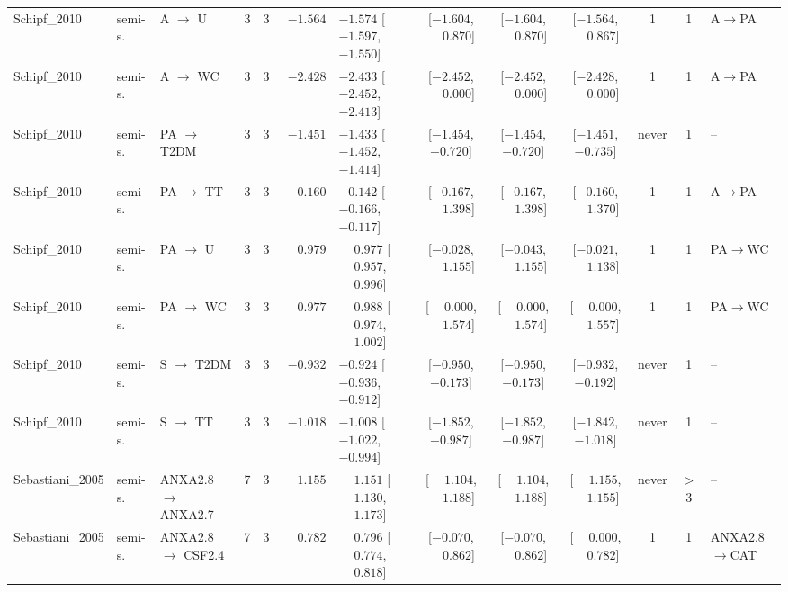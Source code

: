 \begin{landscape}
\begin{longtable}{@{}llp{2.15cm}ccrl cccc c l@{}}
Schipf\_2010 & semi-s. & A $\to$ U & 3 & 3 & $-1.564$ & $-1.574$ [$-1.597$, $-1.550$] & [$-1.604$, $\phantom{-}0.870$] & [$-1.604$, $\phantom{-}0.870$] & [$-1.564$, $\phantom{-}0.867$] & 1 & 1 & A$\to$PA \\
Schipf\_2010 & semi-s. & A $\to$ WC & 3 & 3 & $-2.428$ & $-2.433$ [$-2.452$, $-2.413$] & [$-2.452$, $\phantom{-}0.000$] & [$-2.452$, $\phantom{-}0.000$] & [$-2.428$, $\phantom{-}0.000$] & 1 & 1 & A$\to$PA \\
Schipf\_2010 & semi-s. & PA $\to$ T2DM & 3 & 3 & $-1.451$ & $-1.433$ [$-1.452$, $-1.414$] & [$-1.454$, $-0.720$] & [$-1.454$, $-0.720$] & [$-1.451$, $-0.735$] & never & 1 & -- \\
Schipf\_2010 & semi-s. & PA $\to$ TT & 3 & 3 & $-0.160$ & $-0.142$ [$-0.166$, $-0.117$] & [$-0.167$, $\phantom{-}1.398$] & [$-0.167$, $\phantom{-}1.398$] & [$-0.160$, $\phantom{-}1.370$] & 1 & 1 & A$\to$PA \\
Schipf\_2010 & semi-s. & PA $\to$ U & 3 & 3 & $\phantom{-}0.979$ & $\phantom{-}0.977$ [$\phantom{-}0.957$, $\phantom{-}0.996$] & [$-0.028$, $\phantom{-}1.155$] & [$-0.043$, $\phantom{-}1.155$] & [$-0.021$, $\phantom{-}1.138$] & 1 & 1 & PA$\to$WC \\
Schipf\_2010 & semi-s. & PA $\to$ WC & 3 & 3 & $\phantom{-}0.977$ & $\phantom{-}0.988$ [$\phantom{-}0.974$, $\phantom{-}1.002$] & [$\phantom{-}0.000$, $\phantom{-}1.574$] & [$\phantom{-}0.000$, $\phantom{-}1.574$] & [$\phantom{-}0.000$, $\phantom{-}1.557$] & 1 & 1 & PA$\to$WC \\
Schipf\_2010 & semi-s. & S $\to$ T2DM & 3 & 3 & $-0.932$ & $-0.924$ [$-0.936$, $-0.912$] & [$-0.950$, $-0.173$] & [$-0.950$, $-0.173$] & [$-0.932$, $-0.192$] & never & 1 & -- \\
Schipf\_2010 & semi-s. & S $\to$ TT & 3 & 3 & $-1.018$ & $-1.008$ [$-1.022$, $-0.994$] & [$-1.852$, $-0.987$] & [$-1.852$, $-0.987$] & [$-1.842$, $-1.018$] & never & 1 & -- \\
Sebastiani\_2005 & semi-s. & ANXA2.8 $\to$ ANXA2.7 & 7 & 3 & $\phantom{-}1.155$ & $\phantom{-}1.151$ [$\phantom{-}1.130$, $\phantom{-}1.173$] & [$\phantom{-}1.104$, $\phantom{-}1.188$] & [$\phantom{-}1.104$, $\phantom{-}1.188$] & [$\phantom{-}1.155$, $\phantom{-}1.155$] & never & $>$3 & -- \\
Sebastiani\_2005 & semi-s. & ANXA2.8 $\to$ CSF2.4 & 7 & 3 & $\phantom{-}0.782$ & $\phantom{-}0.796$ [$\phantom{-}0.774$, $\phantom{-}0.818$] & [$-0.070$, $\phantom{-}0.862$] & [$-0.070$, $\phantom{-}0.862$] & [$\phantom{-}0.000$, $\phantom{-}0.782$] & 1 & 1 & ANXA2.8$\to$CAT \\

\end{longtable}
\end{landscape}
